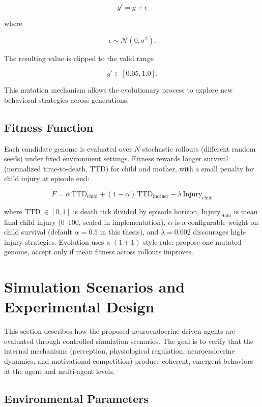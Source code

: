 \[
g' = g + \epsilon
\]

where

\[
\epsilon \sim \mathcal{N}(0, \sigma^2).
\]

The resulting value is clipped to the valid range

\[
g' \in [0.05, 1.0].
\]

This mutation mechanism allows the evolutionary process to explore
new behavioral strategies across generations.






\subsection{Fitness Function}

Each candidate genome is evaluated over $N$ stochastic rollouts (different random seeds) under fixed environment settings. Fitness rewards longer survival (normalized time-to-death, TTD) for child and mother, with a small penalty for child injury at episode end:

\begin{equation}
F = \alpha \,\mathrm{TTD}_{\text{child}} + (1-\alpha)\,\mathrm{TTD}_{\text{mother}} - \lambda \,\mathrm{Injury}_{\text{child}}
\label{eq:fitness}
\end{equation}

where $\mathrm{TTD}_{\cdot}\in[0,1]$ is death tick divided by episode horizon, $\mathrm{Injury}_{\text{child}}$ is mean final child injury (0--100, scaled in implementation), $\alpha$ is a configurable weight on child survival (default $\alpha=0.5$ in this thesis), and $\lambda=0.002$ discourages high-injury strategies. Evolution uses a $(1{+}1)$-style rule: propose one mutated genome, accept only if mean fitness across rollouts improves.




\section{Simulation Scenarios and Experimental Design}

This section describes how the proposed neuroendocrine-driven agents are evaluated through controlled simulation scenarios. The goal is to verify that the internal mechanisms (perception, physiological regulation, neuroendocrine dynamics, and motivational competition) produce coherent, emergent behaviors at the agent and multi-agent levels.

\subsection{Environmental Parameters}


